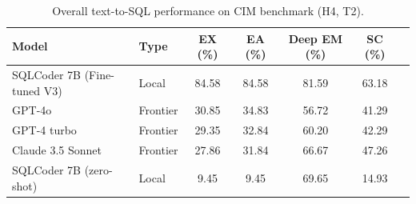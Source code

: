 \begin{table}[t]
  \centering
  \caption{Overall text-to-SQL performance on CIM benchmark (H4, T2).}
  \label{tab:t2}
  \small
  \begin{tabular}{llccccc}
    \toprule
    Model & Type & EX (\%) & EA (\%) & Deep EM (\%) & SC (\%) \\
    \midrule
    SQLCoder 7B (Fine-tuned V3) & Local & 84.58 & 84.58 & 81.59 & 63.18 \\
    GPT-4o & Frontier & 30.85 & 34.83 & 56.72 & 41.29 \\
    GPT-4 turbo & Frontier & 29.35 & 32.84 & 60.20 & 42.29 \\
    Claude 3.5 Sonnet & Frontier & 27.86 & 31.84 & 66.67 & 47.26 \\
    SQLCoder 7B (zero-shot) & Local & 9.45 & 9.45 & 69.65 & 14.93 \\
    \bottomrule
  \end{tabular}
\end{table}
